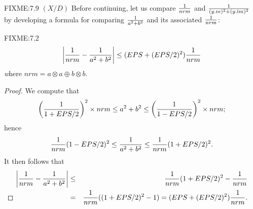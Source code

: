 \begin{definition}
\begin{proposition}{FIXME:7.9 $(X / D)$}
Before continuing, let us compare ${1 \over nrm}$ and ${1 \over (y.{\mathrm re})^2 + (y.{\mathrm im})^2}$ by developing a formula for
comparing ${1 \over a^2 + b^2}$ and its associated ${1 \over nrm}$:
\begin{lemma}{FIXME:7.2} $$\left|{1 \over nrm} - {1 \over a^2 + b^2}\right| \le   (EPS + (EPS/2)^2) {1 \over nrm}$$
{\textit where} $nrm = a\otimes a \oplus b \otimes b.$
\end{lemma}

\begin{proof}{}
We compute that 
$$\left({1 \over 1 + EPS/2}\right)^2 \times nrm
\le a^2 + b^2 
\le \left({1 \over 1 - EPS/2}\right)^2 \times nrm;$$ hence 
$${1 \over nrm} (1 - EPS/2)^2 
\le {1 \over a^2 + b^2}
\le {1 \over nrm} (1 + EPS/2)^2.$$  It then follows that 
\begin{eqnarray*}
\left|{1 \over nrm} - {1 \over a^2 + b^2}\right|& \le &
    {1 \over nrm} (1 + EPS/2)^2 - {1 \over nrm}\\
&=& {1 \over nrm} ((1 + EPS/2)^2 - 1) =
  (EPS + (EPS/2)^2){1 \over nrm} .\\
\noalign{\vskip-24pt}
\end{eqnarray*}
\end{proof}


\end{proposition}
\end{definition}
